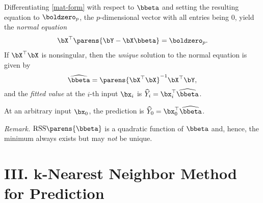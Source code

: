\documentclass[12pt]{article}
\begin{document}
\begin{enumerate}[label=\textbf{\arabic*.}]
	Differentiating \eqref{mat-form} with respect to $\bbeta$ and setting the resulting equation to $\boldzero_p$, the $p$-dimensional vector with all entries being 0, yield the \emph{normal equation} 
	\begin{align}
		\bX^\top \parens{\bY - \bX \bbeta} = \boldzero_p. 
	\end{align}
	If $\bX^\top \bX$ is nonsingular, then the \emph{unique} solution to the normal equation is given by 
	\begin{equation}
		\widehat{\bbeta} = \parens{\bX^\top \bX}^{-1} \bX^\top \bY, 
	\end{equation}
	and the \emph{fitted value} at the $i$-th input $\bx_i$ is $\widehat{Y}_i = \bx_i^\top \widehat{\bbeta}$. 
	
	At an arbitrary input $\bx_0$, the prediction is $\widehat{Y}_0 = \bx_0^\top \widehat{\bbeta}$. 
	
	\textit{Remark.} $\mathrm{RSS} \parens{\bbeta}$ is a quadratic function of $\bbeta$ and, hence, the minimum always exists but may \emph{not} be unique. 

\end{enumerate}


\section*{III. $\boldsymbol{k}$-Nearest Neighbor Method for Prediction}
\end{document}
